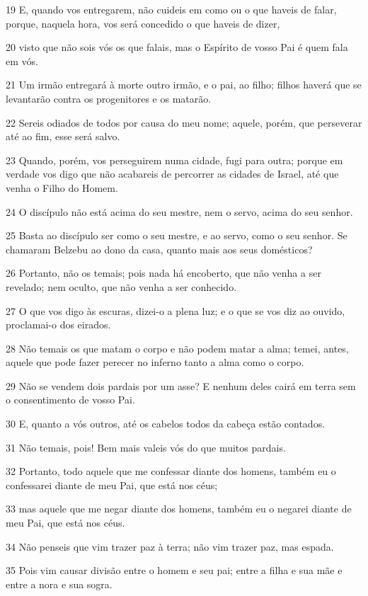 \par 19 E, quando vos entregarem, não cuideis em como ou o que haveis de falar, porque, naquela hora, vos será concedido o que haveis de dizer,
\par 20 visto que não sois vós os que falais, mas o Espírito de vosso Pai é quem fala em vós.
\par 21 Um irmão entregará à morte outro irmão, e o pai, ao filho; filhos haverá que se levantarão contra os progenitores e os matarão.
\par 22 Sereis odiados de todos por causa do meu nome; aquele, porém, que perseverar até ao fim, esse será salvo.
\par 23 Quando, porém, vos perseguirem numa cidade, fugi para outra; porque em verdade vos digo que não acabareis de percorrer as cidades de Israel, até que venha o Filho do Homem.
\par 24 O discípulo não está acima do seu mestre, nem o servo, acima do seu senhor.
\par 25 Basta ao discípulo ser como o seu mestre, e ao servo, como o seu senhor. Se chamaram Belzebu ao dono da casa, quanto mais aos seus domésticos?
\par 26 Portanto, não os temais; pois nada há encoberto, que não venha a ser revelado; nem oculto, que não venha a ser conhecido.
\par 27 O que vos digo às escuras, dizei-o a plena luz; e o que se vos diz ao ouvido, proclamai-o dos eirados.
\par 28 Não temais os que matam o corpo e não podem matar a alma; temei, antes, aquele que pode fazer perecer no inferno tanto a alma como o corpo.
\par 29 Não se vendem dois pardais por um asse? E nenhum deles cairá em terra sem o consentimento de vosso Pai.
\par 30 E, quanto a vós outros, até os cabelos todos da cabeça estão contados.
\par 31 Não temais, pois! Bem mais valeis vós do que muitos pardais.
\par 32 Portanto, todo aquele que me confessar diante dos homens, também eu o confessarei diante de meu Pai, que está nos céus;
\par 33 mas aquele que me negar diante dos homens, também eu o negarei diante de meu Pai, que está nos céus.
\par 34 Não penseis que vim trazer paz à terra; não vim trazer paz, mas espada.
\par 35 Pois vim causar divisão entre o homem e seu pai; entre a filha e sua mãe e entre a nora e sua sogra.
